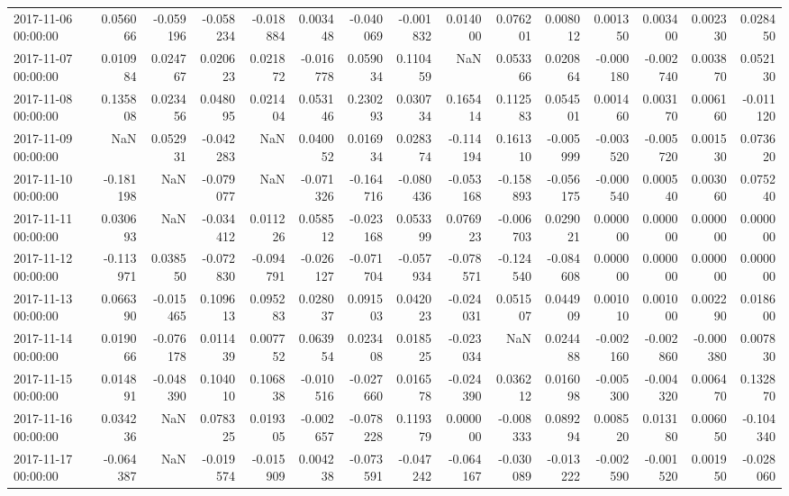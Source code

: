 \begin{tabular}{lrrrrrrrrrrrrrr}
2017-11-06 00:00:00 & 0.056066 & -0.059196 & -0.058234 & -0.018884 & 0.003448 & -0.040069 & -0.001832 & 0.014000 & 0.076201 & 0.008012 & 0.001350 & 0.003400 & 0.002330 & 0.028450 \\
2017-11-07 00:00:00 & 0.010984 & 0.024767 & 0.020623 & 0.021872 & -0.016778 & 0.059034 & 0.110459 & NaN & 0.053366 & 0.020864 & -0.000180 & -0.002740 & 0.003870 & 0.052130 \\
2017-11-08 00:00:00 & 0.135808 & 0.023456 & 0.048095 & 0.021404 & 0.053146 & 0.230293 & 0.030734 & 0.165414 & 0.112583 & 0.054501 & 0.001460 & 0.003170 & 0.006160 & -0.011120 \\
2017-11-09 00:00:00 & NaN & 0.052931 & -0.042283 & NaN & 0.040052 & 0.016934 & 0.028374 & -0.114194 & 0.161310 & -0.005999 & -0.003520 & -0.005720 & 0.001530 & 0.073620 \\
2017-11-10 00:00:00 & -0.181198 & NaN & -0.079077 & NaN & -0.071326 & -0.164716 & -0.080436 & -0.053168 & -0.158893 & -0.056175 & -0.000540 & 0.000540 & 0.003060 & 0.075240 \\
2017-11-11 00:00:00 & 0.030693 & NaN & -0.034412 & 0.011226 & 0.058512 & -0.023168 & 0.053399 & 0.076923 & -0.006703 & 0.029021 & 0.000000 & 0.000000 & 0.000000 & 0.000000 \\
2017-11-12 00:00:00 & -0.113971 & 0.038550 & -0.072830 & -0.094791 & -0.026127 & -0.071704 & -0.057934 & -0.078571 & -0.124540 & -0.084608 & 0.000000 & 0.000000 & 0.000000 & 0.000000 \\
2017-11-13 00:00:00 & 0.066390 & -0.015465 & 0.109613 & 0.095283 & 0.028037 & 0.091503 & 0.042023 & -0.024031 & 0.051507 & 0.044909 & 0.001010 & 0.001000 & 0.002290 & 0.018600 \\
2017-11-14 00:00:00 & 0.019066 & -0.076178 & 0.011439 & 0.007752 & 0.063954 & 0.023408 & 0.018525 & -0.023034 & NaN & 0.024488 & -0.002160 & -0.002860 & -0.000380 & 0.007830 \\
2017-11-15 00:00:00 & 0.014891 & -0.048390 & 0.104010 & 0.106838 & -0.010516 & -0.027660 & 0.016578 & -0.024390 & 0.036212 & 0.016098 & -0.005300 & -0.004320 & 0.006470 & 0.132870 \\
2017-11-16 00:00:00 & 0.034236 & NaN & 0.078325 & 0.019305 & -0.002657 & -0.078228 & 0.119379 & 0.000000 & -0.008333 & 0.089294 & 0.008520 & 0.013180 & 0.006050 & -0.104340 \\
2017-11-17 00:00:00 & -0.064387 & NaN & -0.019574 & -0.015909 & 0.004238 & -0.073591 & -0.047242 & -0.064167 & -0.030089 & -0.013222 & -0.002590 & -0.001520 & 0.001950 & -0.028060 \\

\end{tabular}
